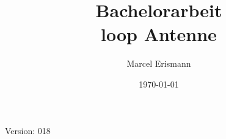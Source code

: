 \documentclass[10pt,a4paper]{article}
\author{Marcel Erismann}
\date{\today}
\title{Bachelorarbeit \\ \footnotesize{loop Antenne}}
\begin{document}
	
	
	Version: 018
	\tableofcontents 
	\newpage
	
\end{document}

